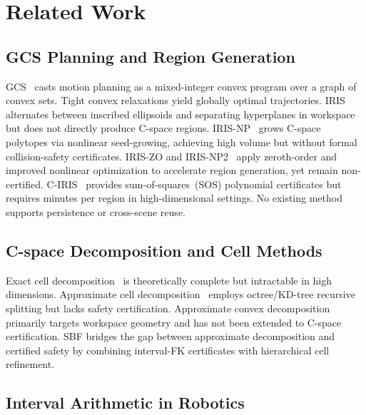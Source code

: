 \documentclass[letterpaper, conference]{IEEEtran}
\begin{document}
\section{Related Work}\label{sec:related}



\subsection{GCS Planning and Region Generation}

GCS~\cite{marcucci2024motion} casts motion planning as a mixed-integer convex
program over a graph of convex sets.
Tight convex relaxations yield globally optimal trajectories.
IRIS~\cite{deits2015computing} alternates between inscribed ellipsoids and
separating hyperplanes in workspace but does not directly produce C-space
regions.
IRIS-NP~\cite{petersen2023growing} grows C-space polytopes via nonlinear
seed-growing, achieving high volume but without formal collision-safety
certificates.
IRIS-ZO and IRIS-NP2~\cite{werner2024faster} apply zeroth-order and improved
nonlinear optimization to accelerate region generation, yet remain
non-certified.
C-IRIS~\cite{werner2024certified} provides sum-of-squares~(SOS)
polynomial certificates but requires minutes per region in
high-dimensional settings.
No existing method supports persistence or cross-scene reuse.

\subsection{C-space Decomposition and Cell Methods}

Exact cell decomposition~\cite{schwartz1983piano} is theoretically complete
but intractable in high dimensions.
Approximate cell decomposition~\cite{zhu1991new} employs octree/KD-tree
recursive splitting but lacks safety certification.
Approximate convex decomposition~\cite{lien2008approximate} primarily targets
workspace geometry and has not been extended to C-space certification.
SBF bridges the gap between approximate decomposition and certified safety
by combining interval-FK certificates with hierarchical cell refinement.

\subsection{Interval Arithmetic in Robotics}
\end{document}
